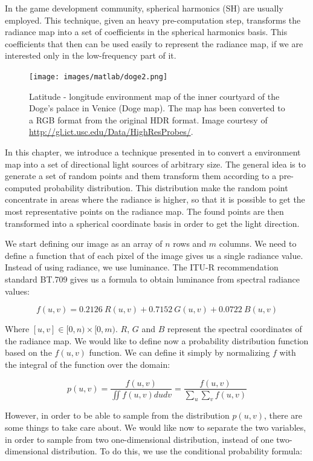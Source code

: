 In the game development community, spherical harmonics (SH) \citep{green,peterpikeconference} are usually employed. This technique, given an heavy pre-computation step, transforms the radiance map into a set of coefficients in the spherical harmonics basis. This coefficients that then can be used easily to represent the radiance map, if we are interested only in the low-frequency part of it. 

\begin{figure}[!ht]
\centering
\texttt{[image: images/matlab/doge2.png]}
\caption{Latitude - longitude environment map of the inner courtyard of the Doge's palace in Venice (Doge map). The map has been converted to a RGB format from the original HDR format. Image courtesy of \url{http://gl.ict.usc.edu/Data/HighResProbes/}.}
\label{fig:doge}
\end{figure}

In this chapter, we introduce a technique presented in \cite{Pharr:2004:PBR:975275} to convert a environment map into a set of directional light sources of arbitrary size. The general idea is to generate a set of random points and them transform them according to a pre-computed probability distribution. This distribution make the random point concentrate in areas where the radiance is higher, so that it is possible to get the most representative points on the radiance map. The found points are then transformed into a spherical coordinate basis in order to get the light direction.

We start defining our image as an array of $n$ rows and $m$ columns. We need to define a function that of each pixel of the image gives us a single radiance value. Instead of using radiance, we use luminance. The ITU-R recommendation standard BT.709\citep{BT.709-2} gives us a formula to obtain luminance from spectral radiance values:

$$
f(u,v) = 0.2126\ R(u,v) + 0.7152\ G(u,v) + 0.0722\ B(u,v)
$$

Where $[u,v] \in [0,n)\times [0,m)$. $R$, $G$ and $B$ represent the spectral coordinates of the radiance map. We would like to define now a probability distribution function based on the $f(u,v)$ function. We can define it simply by normalizing $f$ with the integral of the function over the domain:

$$
p(u,v) = \frac{f(u,v)}{ \displaystyle\iint f(u,v) du dv} = \frac{f(u,v)}{ \displaystyle\sum_u \sum_v f(u,v)}
$$

However, in order to be able to sample from the distribution $p(u,v)$, there are some things to take care about. We would like now to separate the two variables, in order to sample from two one-dimensional distribution, instead of one two-dimensional distribution. To do this, we use the conditional probability formula:

